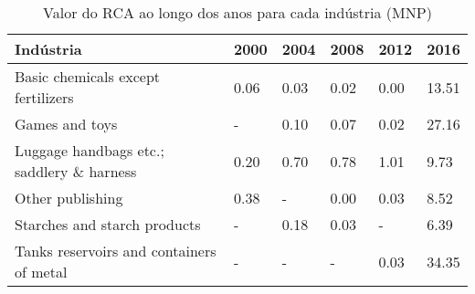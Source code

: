 \begin{table}
\centering
\caption{Valor do RCA ao longo dos anos para cada indústria (MNP)}
\begin{tabular}{p{6cm}p{1.5cm}p{1.5cm}p{1.5cm}p{1.5cm}p{1.5cm}}
\toprule
                                Indústria & 2000 & 2004 & 2008 & 2012 &  2016 \\
\midrule
       Basic chemicals except fertilizers & 0.06 & 0.03 & 0.02 & 0.00 & 13.51 \\
                           Games and toys &    - & 0.10 & 0.07 & 0.02 & 27.16 \\
Luggage handbags etc.; saddlery \& harness & 0.20 & 0.70 & 0.78 & 1.01 &  9.73 \\
                         Other publishing & 0.38 &    - & 0.00 & 0.03 &  8.52 \\
             Starches and starch products &    - & 0.18 & 0.03 &    - &  6.39 \\
 Tanks reservoirs and containers of metal &    - &    - &    - & 0.03 & 34.35 \\
\bottomrule
\end{tabular}
\end{table}
